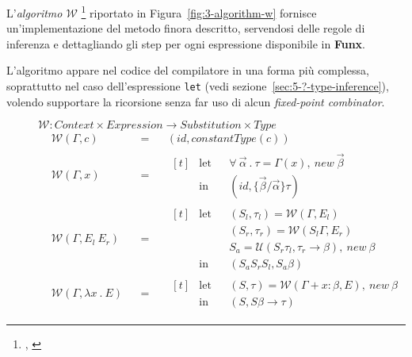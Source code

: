 \noindent L'\textit{algoritmo $\mathcal{W}$}%
\footnote{, \cite{Lee-1998-FolkloreInference}}
riportato in Figura~\ref{fig:3-algorithm-w} fornisce un'implementazione del metodo finora descritto,
servendosi delle regole di inferenza e dettagliando gli step per ogni espressione disponibile in \textbf{Funx}.

\noindent L'algoritmo appare nel codice del compilatore in una forma più complessa,
soprattutto nel caso dell'espressione \texttt{let} (vedi sezione~\ref{sec:5-?-type-inference}),
volendo supportare la ricorsione senza far uso di alcun \textit{fixed-point combinator}.

\newpage

\begin{figure}
    $\mathcal{W} : Context \times Expression \rightarrow Substitution \times Type$
    \newcommand{\algW}[2]{\mathcal{W}(#1, #2)}
    \newcommand{\algWline}[2]{& \algW{#1}{#2} & & = & &}
    \[
        \begin{aligned}
            \algWline{\Gamma}{c} (id, constantType(c))
            \\
            \algWline{\Gamma}{x}
            \begin{aligned}[t]
                 & \text{let} &  & \forall\ \vec{\alpha}\ .\ \tau = \Gamma(x),\ new\ \vec{\beta} \\
                 & \text{in}  &  & (id, \{\vec{\beta} / \vec{\alpha}\} \tau)
            \end{aligned}
            \\
            \algWline{\Gamma}{E_l\ E_r}
            \begin{aligned}[t]
                 & \text{let} &  & (S_l, \tau_l) = \algW{\Gamma}{E_l}                                   \\
                 &            &  & (S_r, \tau_r) = \algW{S_l\Gamma}{E_r}                                \\
                 &            &  & S_a = \mathcal{U}(S_r \tau_l, \tau_r \rightarrow \beta),\ new\ \beta \\
                 & \text{in}  &  & (S_a S_r S_l, S_a \beta)
            \end{aligned}
            \\
            \algWline{\Gamma}{\lambda x\ .\ E}
            \begin{aligned}[t]
                 & \text{let} &  & (S, \tau) = \algW{\Gamma + x : \beta}{E},\ new\ \beta \\
                 & \text{in}  &  & (S, S \beta \rightarrow \tau)

\end{aligned}
\end{aligned}\]
\end{figure}
